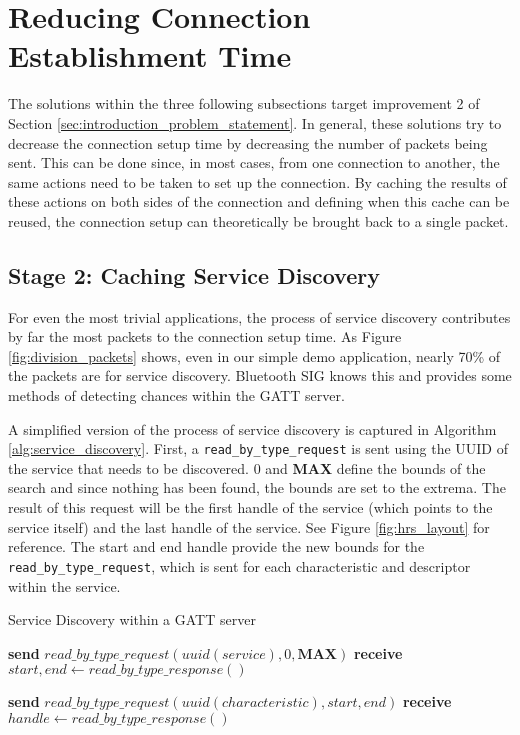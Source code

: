\section{Reducing Connection Establishment Time}
The solutions within the three following subsections target improvement 2 of Section \ref{sec:introduction_problem_statement}. In general, these solutions try to decrease the connection setup time by decreasing the number of packets being sent. This can be done since, in most cases, from one connection to another, the same actions need to be taken to set up the connection. By caching the results of these actions on both sides of the connection and defining when this cache can be reused, the connection setup can theoretically be brought back to a single packet.

\subsection{Stage 2: Caching Service Discovery}
For even the most trivial applications, the process of service discovery contributes by far the most packets to the connection setup time. As Figure \ref{fig:division_packets} shows, even in our simple demo application, nearly 70\% of the packets are for service discovery. Bluetooth SIG knows this and provides some methods of detecting chances within the GATT server.

A simplified version of the process of service discovery is captured in Algorithm \ref{alg:service_discovery}. First, a \texttt{read\_by\_type\_request} is sent using the UUID of the service that needs to be discovered. 0 and \textbf{MAX} define the bounds of the search and since nothing has been found, the bounds are set to the extrema. The result of this request will be the first handle of the service (which points to the service itself) and the last handle of the service. See Figure \ref{fig:hrs_layout} for reference. The start and end handle provide the new bounds for the \texttt{read\_by\_type\_request}, which is sent for each characteristic and descriptor within the service.
\begin{algorithm}
    \caption{Service Discovery within a GATT server}
    \label{alg:service_discovery}
    \begin{algorithmic}[1] 
                \State \textbf{send} $\textit{read\_by\_type\_request}(\textit{uuid}(service), 0, \textbf{MAX})$
                \State \textbf{receive} $start,end \gets \textit{read\_by\_type\_response}()$

                    \State \textbf{send} $\textit{read\_by\_type\_request}(\textit{uuid}(characteristic), start, end)$
                    \State \textbf{receive} $handle \gets \textit{read\_by\_type\_response}()$
                \EndFor
            \EndFor
        \EndProcedure
    \end{algorithmic}
\end{algorithm}

